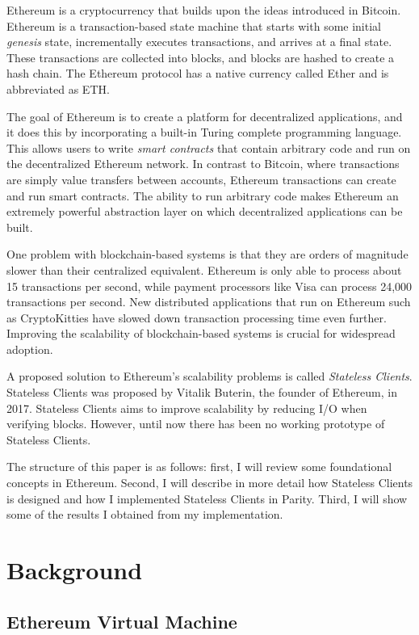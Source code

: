 \documentclass[12pt]{article}
\newcounter{protocol}
\newcommand{\System}{Stateless Clients\xspace}
\begin{document}
Ethereum is a cryptocurrency that builds upon the ideas introduced in Bitcoin. Ethereum is a transaction-based state machine that starts with some initial \emph{genesis} state, incrementally executes transactions, and arrives at a final state. These transactions are collected into blocks, and blocks are hashed to create a hash chain. The Ethereum protocol has a native currency called Ether and is abbreviated as ETH.

The goal of Ethereum is to create a platform for decentralized applications, and it does this by incorporating a built-in Turing complete programming language. This allows users to write \emph{smart contracts} that contain arbitrary code and run on the decentralized Ethereum network. In contrast to Bitcoin, where transactions are simply value transfers between accounts, Ethereum transactions can create and run smart contracts. The ability to run arbitrary code makes Ethereum an extremely powerful abstraction layer on which decentralized applications can be built.

One problem with blockchain-based systems is that they are orders of magnitude slower than their centralized equivalent. Ethereum is only able to process about 15 transactions per second, while payment processors like Visa can process 24,000 transactions per second. New distributed applications that run on Ethereum such as CryptoKitties have slowed down transaction processing time even further. Improving the scalability of blockchain-based systems is crucial for widespread adoption.

A proposed solution to Ethereum's scalability problems is called \emph{\System}. \System was proposed by Vitalik Buterin, the founder of Ethereum, in 2017. \System aims to improve scalability by reducing I/O when verifying blocks. However, until now there has been no working prototype of \System.

The structure of this paper is as follows: first, I will review some foundational concepts in Ethereum. Second, I will describe in more detail how \System is designed and how I implemented \System in Parity. Third, I will show some of the results I obtained from my implementation.

\section{Background}

\subsection{Ethereum Virtual Machine}
\end{document}
